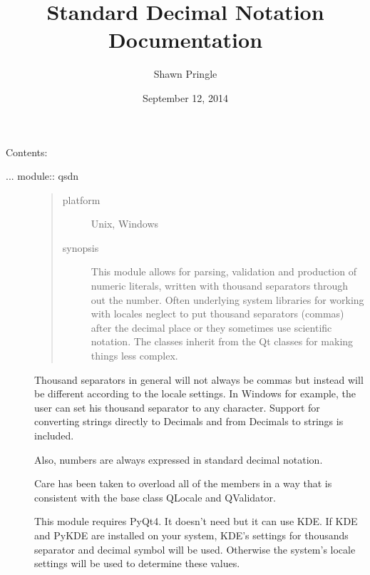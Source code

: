 \documentclass[letterpaper,10pt,english]{sphinxmanual}
\title{Standard Decimal Notation Documentation}
\date{September 12, 2014}
\author{Shawn Pringle}
\begin{document}
\maketitle
\tableofcontents
{}\label{index::doc}


Contents:
\label{index:module-qsdn}\begin{description}
\item[{... module:: qsdn}] \leavevmode\begin{quote}\begin{description}
\item[{platform}] \leavevmode
Unix, Windows

\item[{synopsis}] \leavevmode
This module allows for parsing, validation and production of numeric literals, written with thousand separators through out the number.  Often underlying system libraries for working with locales neglect to put thousand separators (commas) after the decimal place or they sometimes use scientific notation.  The classes inherit from the Qt classes for making things less complex.

\end{description}\end{quote}

Thousand separators in general will not always be commas but instead will be different according to the locale settings.  In Windows for example, the user can set his thousand separator to any character.  Support for converting strings directly to Decimals and from Decimals to strings is included.

Also, numbers are always expressed in standard decimal notation.

Care has been taken to overload all of the members in a way
that is consistent with the base class QLocale and QValidator.

This module requires PyQt4.  It doesn't need but it can use KDE.  If KDE and PyKDE are installed on your system, KDE's settings for thousands separator and decimal symbol will be used.  Otherwise
the system's locale settings will be used to determine these values.

\end{description}
\end{document}

